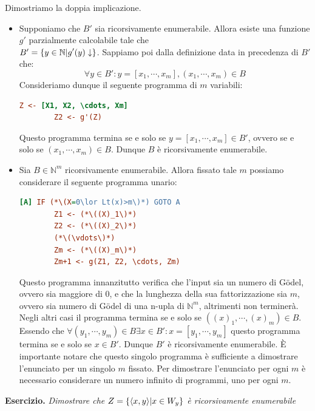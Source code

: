 Dimostriamo la doppia implicazione.
\begin{itemize}
    \item[\(\Longleftarrow\)] Supponiamo che \(B'\) sia ricorsivamente enumerabile. Allora esiste una funzione \(g'\) parzialmente calcolabile tale che \\
    \(B'=\displaystyle{\left\{{y \in \mathbb{N} \vert g'(y)\downarrow}\right\}}\). Sappiamo poi dalla definizione data in precedenza di \(B'\) che:
    \begin{equation}
        \forall y \in B': y=[x_1, \cdots, x_m], (x_1, \cdots, x_m) \in B
    \end{equation}
    Consideriamo dunque il seguente programma di \(m\) variabili:
    \begin{lstlisting}[language=ini,  caption={ }]
        Z <- [X1, X2, \cdots, Xm]
        Z2 <- g'(Z)
    \end{lstlisting}
    Questo programma termina se e solo se \(y=[x_1, \cdots, x_m] \in B'\), ovvero se e solo se \((x_1, \cdots, x_m) \in B\). Dunque \(B\) è ricorsivamente enumerabile.
    \item[\(\Longrightarrow\)] Sia \(B \in \mathbb{N}^m\) ricorsivamente enumerabile. Allora fissato tale \(m\) possiamo considerare il seguente programma unario:
    \begin{lstlisting}[language=ini,  caption={ }]
    [A] IF (*\(X=0\lor Lt(x)>m\)*) GOTO A
        Z1 <- (*\((X)_1\)*)
        Z2 <- (*\((X)_2\)*)
        (*\(\vdots\)*)
        Zm <- (*\((X)_m\)*)
        Zm+1 <- g(Z1, Z2, \cdots, Zm)
    \end{lstlisting}
    Questo programma innanzitutto verifica che l'input sia un numero di Gödel, ovvero sia maggiore di \(0\), e che la lunghezza della sua fattorizzazione sia \(m\), ovvero sia numero di Gödel di una n-upla di \(\mathbb{N}^m\), altrimenti non terminerà. Negli altri casi il programma termina se e solo se \(({(x)}_1, \cdots, {(x)}_m) \in B\). Essendo che \(\forall (y_1, \cdots, y_m) \in B \exists x \in B' : x=[y_1, \cdots, y_m]\) questo programma termina se e solo se \(x \in B'\). Dunque \(B'\) è ricorsivamente enumerabile.
    È importante notare che questo singolo programma è sufficiente a dimostrare l'enunciato per un singolo \(m\) fissato. Per dimostrare l'enunciato per ogni \(m\) è necessario considerare un numero infinito di programmi, uno per ogni \(m\).
\end{itemize}

\textbf{Esercizio. } \textit{Dimostrare che \(Z=\displaystyle{\left\{{ \displaystyle{\left\langle{ x,y }\right\rangle} \vert x \in W_y}\right\}}\) è ricorsivamente enumerabile}

